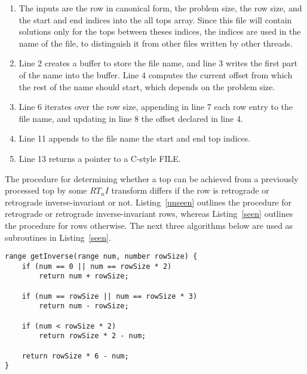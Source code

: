 \begin{enumerate}
\item The inputs are the row in canonical form, the problem size, the row size, and the start and end indices into the all tops array. Since this file will contain solutions only for the tops between theses indices, the indices are used in the name of the file, to distinguish it from other files written by other threads.
\item Line 2 creates a buffer to store the file name, and line 3 writes the first part of the name into the buffer. Line 4 computes the current offset from which the rest of the name should start, which depends on the problem size.
\addtocounter{enumi}{3}
\item Line 6 iterates over the row size, appending in line 7 each row entry to the file name, and updating in line 8 the offset declared in line 4.
\addtocounter{enumi}{4}
\item Line 11 appends to the file name the start and end top indices.
\addtocounter{enumi}{1}
\item Line 13 returns a pointer to a C-style FILE.
\end{enumerate}

The procedure for determining whether a top can be achieved from a previously processed top by some $RT_nI$ transform differs if the row is retrograde or retrograde inverse-invariant or not. Listing~\ref{unseen} outlines the procedure for retrograde or retrograde inverse-invariant rows, whereas Listing~\ref{seen} outlines the procedure for rows otherwise. The next three algorithms below are used as subroutines in Listing~\ref{seen}.

\begin{lstlisting}[caption={Computing the index of the inverse row within a row class.},label={getInverse}]
range getInverse(range num, number rowSize) {
    if (num == 0 || num == rowSize * 2)
        return num + rowSize;

    if (num == rowSize || num == rowSize * 3)
        return num - rowSize;

    if (num < rowSize * 2)
        return rowSize * 2 - num;

    return rowSize * 6 - num;
}
\end{lstlisting}

